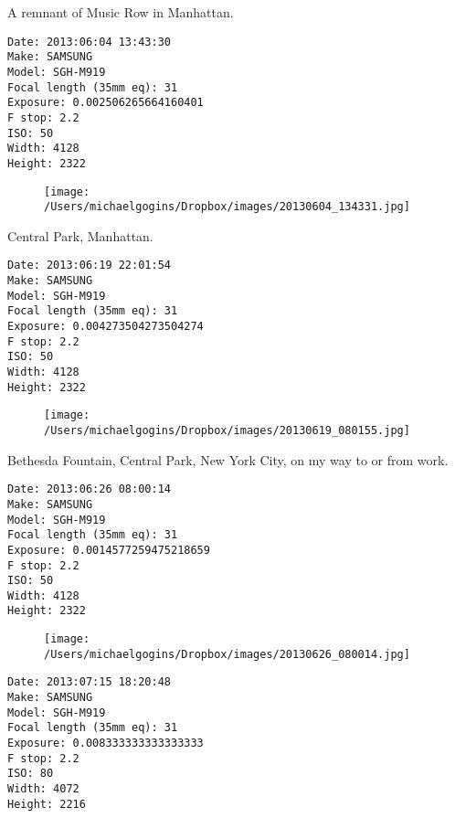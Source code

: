 \documentclass[11pt,letter,DIV=14,paper=landscape]{scrbook}
\begin{document}
\clearpage
\noindent A remnant of Music Row in Manhattan.
\noindent
\begin{lstlisting}
Date: 2013:06:04 13:43:30
Make: SAMSUNG
Model: SGH-M919
Focal length (35mm eq): 31
Exposure: 0.002506265664160401
F stop: 2.2
ISO: 50
Width: 4128
Height: 2322
\end{lstlisting}
\clearpage

\begin{figure}
\texttt{[image: /Users/michaelgogins/Dropbox/images/20130604\_134331.jpg]}
\end{figure}
    
\clearpage
\noindent Central Park, Manhattan.
\noindent
\begin{lstlisting}
Date: 2013:06:19 22:01:54
Make: SAMSUNG
Model: SGH-M919
Focal length (35mm eq): 31
Exposure: 0.004273504273504274
F stop: 2.2
ISO: 50
Width: 4128
Height: 2322
\end{lstlisting}
\clearpage

\begin{figure}
\texttt{[image: /Users/michaelgogins/Dropbox/images/20130619\_080155.jpg]}
\end{figure}
    
\clearpage
\noindent Bethesda Fountain, Central Park, New York City, on my way to or from work.
\noindent
\begin{lstlisting}
Date: 2013:06:26 08:00:14
Make: SAMSUNG
Model: SGH-M919
Focal length (35mm eq): 31
Exposure: 0.0014577259475218659
F stop: 2.2
ISO: 50
Width: 4128
Height: 2322
\end{lstlisting}
\clearpage

\begin{figure}
\texttt{[image: /Users/michaelgogins/Dropbox/images/20130626\_080014.jpg]}
\end{figure}
    
\clearpage
\noindent 
\noindent
\begin{lstlisting}
Date: 2013:07:15 18:20:48
Make: SAMSUNG
Model: SGH-M919
Focal length (35mm eq): 31
Exposure: 0.008333333333333333
F stop: 2.2
ISO: 80
Width: 4072
Height: 2216
\end{lstlisting}
\clearpage
\end{document}
